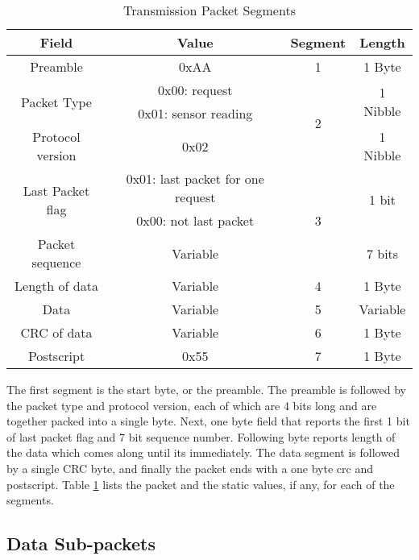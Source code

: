 \begin{table}[H]
    \centering
    {
    \begin{tabular}{|c|c|c|c|}
        \hline
        \rowcolor{black!8}
        \textbf{Field} & \textbf{Value} & \textbf{Segment} & \textbf{Length}\\
        \hline
        Preamble & 0xAA & 1 & 1 Byte\\ \hline
        \multirow{2}{*}{Packet Type} & 0x00: request & \multirow{3}{*}{2} & \multirow{2}{*}{1 Nibble} \\
         & 0x01: sensor reading & & \\ \cline{1-2} \cline{4-4}
        Protocol version & 0x02 &  & 1 Nibble\\ \hline
        \multirow{2}{*}{Last Packet flag} & 0x01: last packet for one request & \multirow{3}{*}{3} & \multirow{2}{*}{1 bit} \\
         & 0x00: not last packet & & \\ \cline{1-2} \cline{4-4}
        Packet sequence & Variable &  & 7 bits \\ \hline
        Length of data & Variable & 4 & 1 Byte\\ \hline
        Data & Variable & 5 & Variable \\ \hline
        CRC of data & Variable & 6 & 1 Byte\\ \hline
        Postscript & 0x55 & 7 & 1 Byte\\ \hline
    \end{tabular}
    }
    \caption{Transmission Packet Segments}
    \label{table:seg}
\end{table}


The first segment is the start byte, or the preamble. The preamble is followed by the packet type and protocol version, each of which are 4 bits long and are together packed into a single byte.
Next, one byte field that reports the first 1 bit of last packet flag and 7 bit sequence number. Following byte reports length of the data which comes along until its
immediately. The data segment is followed by a single CRC byte, and finally the packet ends with a one byte
crc and postscript. Table \ref{table:seg} lists the packet and the static values, if any, for each of the segments.
\\


\subsection{Data Sub-packets} \label{ssec:sub-pack}

